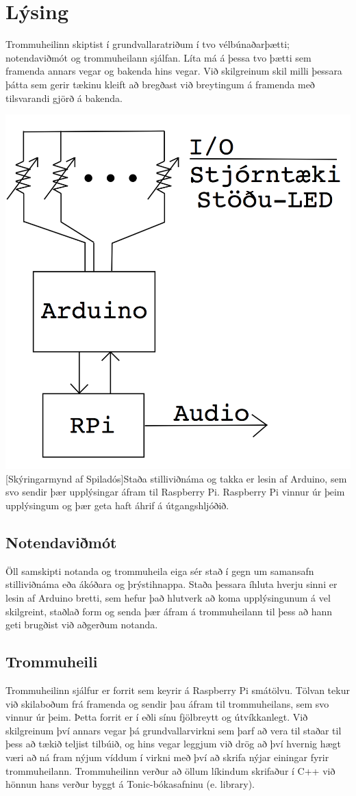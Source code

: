 \documentclass[a4paper,11pt,twocolumn]{article}
\newenvironment{Figure}
  {\par\medskip\noindent\minipage{\linewidth}}
  {\endminipage\par\medskip}
\begin{document}
\section{Lýsing}
Trommuheilinn skiptist í grundvallaratriðum í tvo vélbúnaðarþætti; notendaviðmót og trommu\-heilann sjálfan. Líta má á þessa tvo þætti sem framenda annars vegar og bakenda hins vegar. Við skilgreinum skil milli þessara þátta sem gerir tækinu kleift að bregðast við breytingum á framenda með tilsvarandi gjörð á bakenda.

\begin{Figure}
	\centering
 	\includegraphics[width=0.3\linewidth]{skyring.png}
	[Skýringarmynd af Spiladós]{Staða stilliviðnáma og takka er lesin af Arduino, sem svo sendir þær upplýsingar áfram til Raspberry Pi. Raspberry Pi vinnur úr þeim upplýsingum og þær geta haft áhrif á útgangshljóðið.}
\end{Figure}

\subsection{Notendaviðmót}
Öll samskipti notanda og trommuheila eiga sér stað í gegn um samansafn stilliviðnáma eða ákóðara og þrýstihnappa. Staða þessara íhluta hverju sinni er lesin af Arduino\cite{arduino} bretti, sem hefur það hlutverk að koma upplýsingunum á vel skilgreint, staðlað form og senda þær áfram á trommuheilann til þess að hann geti brugðist við aðgerðum notanda.
\subsection{Trommuheili}
Trommuheilinn sjálfur er forrit sem keyrir á Raspberry Pi\cite{rpi} smátölvu. Tölvan tekur við skilaboðum frá framenda og sendir þau áfram til trommuheilans, sem svo vinnur úr þeim. Þetta forrit er í eðli sínu fjölbreytt og útvíkkanlegt. Við skilgreinum því annars vegar þá grundvallarvirkni sem þarf að vera til staðar til þess að tækið teljist tilbúið, og hins vegar leggjum við drög að því hvernig hægt væri að ná fram nýjum víddum í virkni með því að skrifa nýjar einingar fyrir trommuheilann. Trommuheilinn verður að öllum líkindum skrifaður í C++ við hönnun hans verður byggt á Tonic-bókasafninu\cite{tonic} (e. library).
\end{document}

